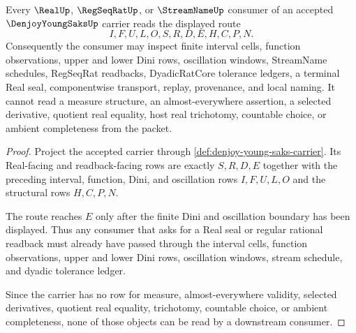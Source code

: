 \begin{theorem}\label{thm:denjoy-young-saks-real-seal-nonescape}
Every $\RealUp$, $\RegSeqRatUp$, or $\StreamNameUp$ consumer of an accepted $\DenjoyYoungSaksUp$ carrier reads the displayed route
$$
I,F,U,L,O,S,R,D,E,H,C,P,N .
$$
Consequently the consumer may inspect finite interval cells, function observations, upper and lower Dini rows, oscillation windows, StreamName schedules, RegSeqRat readbacks, DyadicRatCore tolerance ledgers, a terminal Real seal, componentwise transport, replay, provenance, and local naming. It cannot read a measure structure, an almost-everywhere assertion, a selected derivative, quotient real equality, host real trichotomy, countable choice, or ambient completeness from the packet.
\end{theorem}
\begin{proof}
Project the accepted carrier through \autoref{def:denjoy-young-saks-carrier}. Its Real-facing and readback-facing rows are exactly $S,R,D,E$ together with the preceding interval, function, Dini, and oscillation rows $I,F,U,L,O$ and the structural rows $H,C,P,N$.

The route reaches $E$ only after the finite Dini and oscillation boundary has been displayed. Thus any consumer that asks for a Real seal or regular rational readback must already have passed through the interval cells, function observations, upper and lower Dini rows, oscillation windows, stream schedule, and dyadic tolerance ledger.

Since the carrier has no row for measure, almost-everywhere validity, selected derivatives, quotient real equality, trichotomy, countable choice, or ambient completeness, none of those objects can be read by a downstream consumer.
\end{proof}

